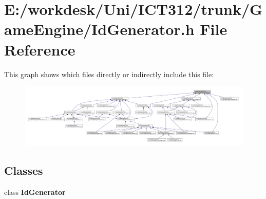 \section{E\+:/workdesk/\+Uni/\+I\+C\+T312/trunk/\+Game\+Engine/\+Id\+Generator.h File Reference}
\label{_id_generator_8h}
This graph shows which files directly or indirectly include this file\+:
\nopagebreak
\begin{figure}[H]
\begin{center}
\leavevmode
\includegraphics[width=350pt]{df/d90/_id_generator_8h__dep__incl}
\end{center}
\end{figure}
\subsection*{Classes}
\begin{DoxyCompactItemize}
\item 
class {\bf Id\+Generator}
\end{DoxyCompactItemize}
